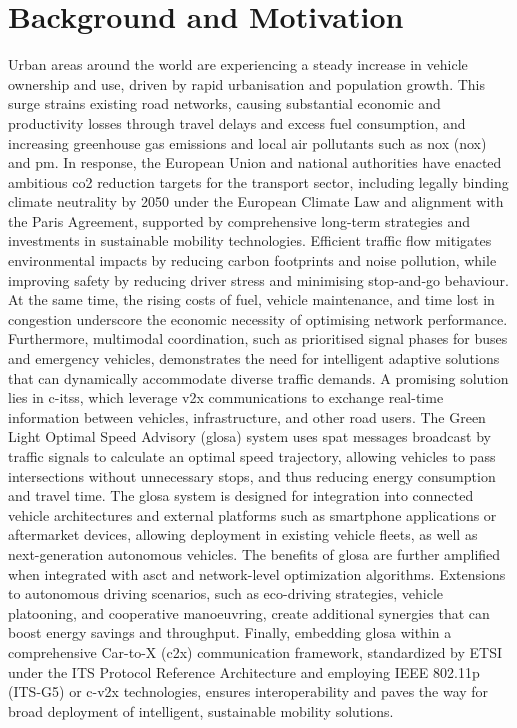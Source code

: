\section{Background and Motivation}
\label{sec:Background_and_Motivation}

Urban areas around the world are experiencing a steady increase in vehicle ownership and use, driven by rapid urbanisation and population growth. This surge strains existing road networks, causing substantial economic and productivity losses through travel delays and excess fuel consumption, and increasing greenhouse gas emissions and local air pollutants such as \acl{nox} (\acs{nox}) and \ac{pm}. In response, the European Union and national authorities have enacted ambitious \ac{co2} reduction targets for the transport sector, including legally binding climate neutrality by 2050 under the European Climate Law and alignment with the Paris Agreement, supported by comprehensive long-term strategies and investments in sustainable mobility technologies. \cite{eclts2050}
\mynewline
Efficient traffic flow mitigates environmental impacts by reducing carbon footprints and noise pollution, while improving safety by reducing driver stress and minimising stop‐and‐go behaviour. At the same time, the rising costs of fuel, vehicle maintenance, and time lost in congestion underscore the economic necessity of optimising network performance. Furthermore, multimodal coordination, such as prioritised signal phases for buses and emergency vehicles, demonstrates the need for intelligent adaptive solutions that can dynamically accommodate diverse traffic demands. 
\mynewline
A promising solution lies in \acp{c-its}, which leverage \ac{v2x} communications to exchange real-time information between vehicles, infrastructure, and other road users. The Green Light Optimal Speed Advisory (\ac{glosa}) system uses \ac{spat} messages broadcast by traffic signals to calculate an optimal speed trajectory, allowing vehicles to pass intersections without unnecessary stops, and thus reducing energy consumption and travel time. \cite{COPPOLA2022103455} The \ac{glosa} system is designed for integration into connected vehicle architectures and external platforms such as smartphone applications or aftermarket devices, allowing deployment in existing vehicle fleets, as well as next-generation autonomous vehicles. 
\mynewline
The benefits of \ac{glosa} are further amplified when integrated with \ac{asct} and network-level optimization algorithms. Extensions to autonomous driving scenarios, such as eco-driving strategies, vehicle platooning, and cooperative manoeuvring, create additional synergies that can boost energy savings and throughput. Finally, embedding \ac{glosa} within a comprehensive Car-to-X (\ac{c2x}) communication framework, standardized by ETSI under the ITS Protocol Reference Architecture and employing IEEE 802.11p (ITS-G5) or \ac{c-v2x} technologies, ensures interoperability and paves the way for broad deployment of intelligent, sustainable mobility solutions. \cite{etsi_tr_102638_v2_1_1}
